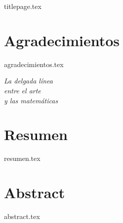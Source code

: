 \documentclass[twoside,openright,11pt]{report}
\begin{document}
\renewcommand{\figurename}{Imagen}
\renewcommand{\listfigurename}{Lista de Imágenes}




\thispagestyle{empty}
{titlepage.tex}

\newpage


\chapter*{Agradecimientos}

{agradecimientos.tex}

\newpage

\vspace*{\fill}
    \begin{flushright}
        \textit{La delgada línea \\
        entre el arte \\
        y las matemáticas}
    \end{flushright}
\vspace*{\fill}







\chapter*{Resumen}

{resumen.tex}


\chapter*{Abstract}

{abstract.tex}
\end{document}
